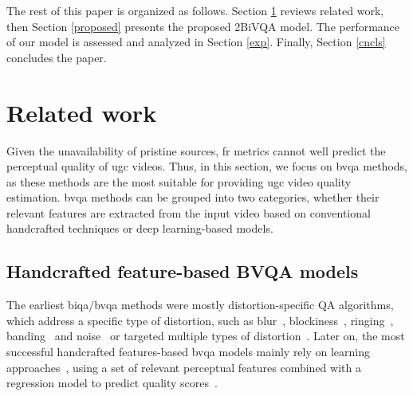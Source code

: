 \documentclass[journal]{IEEEtran}
\begin{document}
The rest of this paper is organized as follows. Section \ref{related work} reviews related work, then Section \ref{proposed} presents the proposed 2BiVQA model. The performance of our model is assessed and analyzed in Section \ref{exp}. Finally, Section \ref{cncls} concludes the paper.

 
\section{Related work}
\label{related work}
Given the unavailability of pristine sources, \ac{fr} metrics cannot well predict the perceptual quality of \ac{ugc} videos. Thus, in this section, we focus on \ac{bvqa} methods, as these methods are the most suitable for providing  \ac{ugc} video quality estimation. \ac{bvqa} methods can be grouped into two categories, whether their relevant features are extracted from the input video based on conventional handcrafted techniques or deep learning-based models.

\subsection{Handcrafted feature-based  BVQA models}
The earliest \ac{biqa}/\ac{bvqa} methods were mostly distortion-specific QA algorithms, which address a specific type of distortion, such as blur~\cite{marziliano2002no, wang2008blind}, blockiness~\cite{wang2000blind, min2017unified}, ringing~\cite{feng2006measurement}, banding~\cite{wang2016perceptual, tu2020bband} and noise~\cite{amer2005fast, norkin2018film} or targeted multiple types of distortion~\cite{gu2014hybrid,lu2015no, min2018blind}. Later on, the most successful handcrafted features-based \ac{bvqa} models mainly rely on learning approaches~\cite{zhai2020perceptual,min2021screen}, using a set of relevant perceptual features combined with a regression model to predict quality scores~\cite{moorthy2011blind, kundu2017no, ghadiyaram2017perceptual, pei2015image}.
\end{document}
